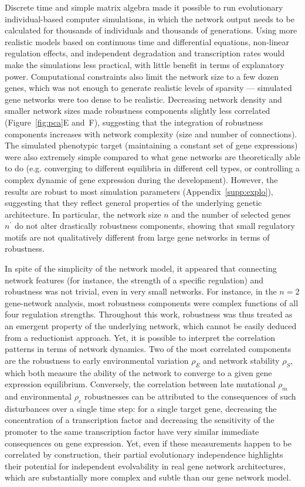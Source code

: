 \documentclass[10pt,a4paper]{article}
\newcommand{\stability}{{\rho_S}}
\newcommand{\earlyenv}{{\rho_E}}
\newcommand{\lateenv}{{\rho_e}}
\newcommand{\latemut}{{\rho_m}}
\newcommand{\SupMat}{Appendix~}
\begin{document}
Discrete time and simple matrix algebra made it possible to run evolutionary individual-based computer simulations, in which the network output needs to be calculated for thousands of individuals and thousands of generations. Using more realistic models based on continuous time and differential equations, non-linear regulation effects, and independent degradation and transcription rates would make the simulations less practical, with little benefit in terms of explanatory power. Computational constraints also limit the network size to a few dozen genes, which was not enough to generate realistic levels of sparsity --- simulated gene networks were too dense to be realistic. Decreasing network density and smaller network sizes made robustness components slightly less correlated (Figure~\ref{fig:pca}E and~F), suggesting that the integration of robustness components increases with network complexity (size and number of connections). The simulated phenotypic target (maintaining a constant set of gene expressions) were also extremely simple compared to what gene networks are theoretically able to do (e.g. converging to different equilibria in different cell types, or controlling a complex dynamic of gene expression during the development). However, the results are robust to most simulation parameters (\SupMat \ref{supp:explo}), suggesting that they reflect general properties of the underlying genetic architecture. In particular, the network size $n$ and the number of selected genes $n^\prime$ do not alter drastically robustness components, showing that small regulatory motifs are not qualitatively different from large gene networks in terms of robustness. 

In spite of the simplicity of the network model, it appeared that connecting network features (for instance, the strength of a specific regulation) and robustness was not trivial, even in very small networks. For instance, in the $n=2$ gene-network analysis, most robustness components were complex functions of all four regulation strengths. Throughout this work, robustness was thus treated as an emergent property of the underlying network, which cannot be easily deduced from a reductionist approach. Yet, it is possible to interpret the correlation patterns in terms of network dynamics. Two of the most correlated components are the robustness to early environmental variation $\earlyenv$ and network stability $\stability$, which both measure the ability of the network to converge to a given gene expression equilibrium. Conversely, the correlation between late mutational $\latemut$ and environmental $\lateenv$ robustnesses can be attributed to the consequences of such disturbances over a single time step: for a single target gene, decreasing the concentration of a transcription factor and decreasing the sensitivity of the promoter to the same transcription factor have very similar immediate consequences on gene expression. Yet, even if these measurements happen to be correlated by construction, their partial evolutionary independence highlights their potential for independent evolvability in real gene network architectures, which are substantially more complex and subtle than our gene network model. 
\end{document}
